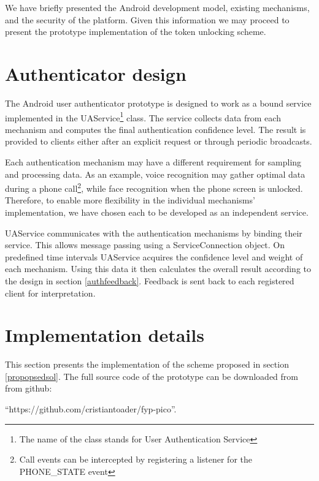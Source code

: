 We have briefly presented the Android development model, existing mechanisms, and the security of the platform. Given this information we may proceed to present the prototype implementation of the token unlocking scheme. 

\section{Authenticator design}
The Android user authenticator prototype is designed to work as a bound service implemented in the UAService\footnote{The name of the class stands for User Authentication Service} class. The service collects data from each mechanism and computes the final authentication confidence level. The result is provided to clients either after an explicit request or through periodic broadcasts.

Each authentication mechanism may have a different requirement for sampling and processing data. As an example, voice recognition may gather optimal data during a phone call\footnote{Call events can be intercepted by registering a listener for the PHONE\_STATE event}, while face recognition when the phone screen is unlocked. Therefore, to enable more flexibility in the individual mechanisms' implementation, we have chosen each to be developed as an independent service.

UAService communicates with the authentication mechanisms by binding their service. This allows message passing using a ServiceConnection object. On predefined time intervals UAService acquires the confidence level and weight of each mechanism. Using this data it then calculates the overall result according to the design in section \ref{authfeedback}. Feedback is sent back to each registered client for interpretation.

\section{Implementation details}
This section presents the implementation of the scheme proposed in section \ref{propopsedsol}. The full source code of the prototype can be downloaded from from github: 

``https://github.com/cristiantoader/fyp-pico''.

